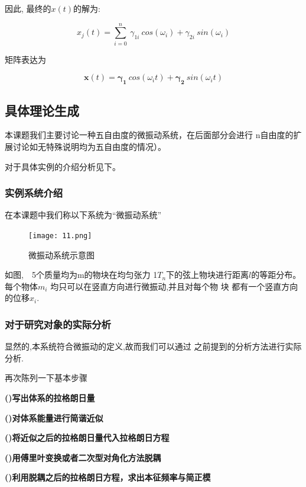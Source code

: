 \documentclass[11pt, a4paper, oneside]{ctexart}
\begin{document}
{因此, 最终的$x(t)$的解为:

\begin{equation}
    x_j(t)=\sum_{i=0}^n \ {\gamma_{1i}}\ cos(\omega_i)+{\gamma_{2i}}\ sin(\omega_i)
\end{equation}

矩阵表达为

\begin{equation}
    \bm x(t)=\bm{\gamma_{1}}\ cos(\omega_it)+\bm{\gamma_{2}}\ sin(\omega_it)
\end{equation}

\subsection{具体理论生成}

本课题我们主要讨论一种五自由度的微振动系统，在后面部分会进行
n自由度的扩展讨论如无特殊说明均为五自由度的情况）。

对于具体实例的介绍分析见下。


\subsubsection{实例系统介绍}
在本课题中我们称以下系统为“微振动系统”
\begin{figure}[!ht]
	
    \centering
    \vspace{4mm}
    \texttt{[image: 11.png]}
    \caption{微振动系统示意图}
\end{figure} 

如图,\ \ 5个质量均为m的物块在均匀张力
1$T_n$下的弦上物块进行距离$l$的等距分布。每个物体$m_i$
均只可以在竖直方向进行微振动,并且对每个物
块
都有一个竖直方向的位移$ x _i$.
\subsubsection{对于研究对象的实际分析}

显然的,本系统符合微振动的定义,故而我们可以通过
之前提到的分析方法进行实际分析.

再次陈列一下基本步骤


\textbf{()写出体系的拉格朗日量}

\textbf{()对体系能量进行简谐近似}

\textbf{()将近似之后的拉格朗日量代入拉格朗日方程}

\textbf{()用傅里叶变换或者二次型对角化方法脱耦}

\textbf{()利用脱耦之后的拉格朗日方程，求出本征频率与简正模}

}
\end{document}
